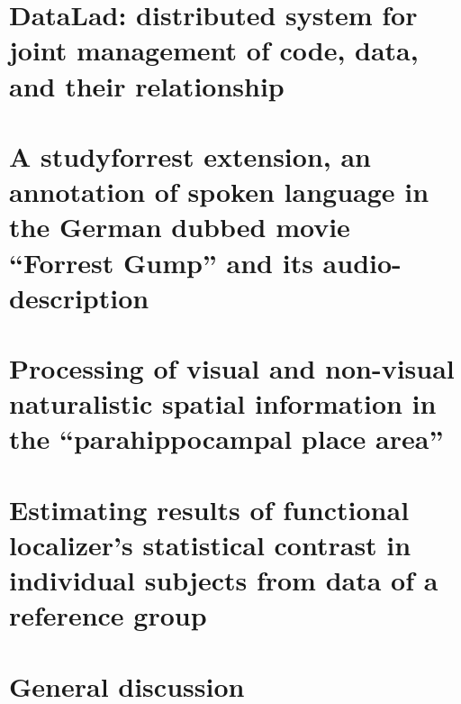 \documentclass[english,12pt]{report}
\begin{document}
\begin{spacing}{1.5}






\chapter{DataLad: distributed system for joint management of code, data, and
their relationship}






\chapter{A studyforrest extension, an annotation of spoken language in the
German dubbed movie ``Forrest Gump'' and its audio-description}






\chapter{Processing of visual and non-visual naturalistic spatial information in
the ``parahippocampal place area''}






\chapter{Estimating results of functional localizer's statistical contrast in
individual subjects from data of a reference group}






\chapter{General discussion}






% 







\end{spacing}
\end{document}

